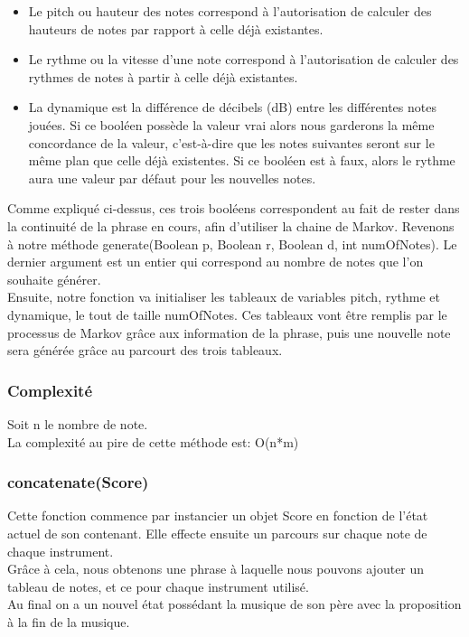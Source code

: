 \documentclass[12pt, a4paper]{article}
\begin{document}
                \begin{itemize}
                    \item Le pitch ou hauteur des notes correspond à l'autorisation de calculer des hauteurs de notes par rapport à celle déjà existantes.
                    \item Le rythme ou la vitesse d'une note correspond à l'autorisation de calculer des rythmes de notes à partir à celle déjà existantes.
                    \item La dynamique est la différence de décibels (dB) entre les différentes notes jouées. Si ce booléen possède la valeur vrai alors nous garderons la même concordance de la valeur, c’est-à-dire que les notes suivantes seront sur le même plan que celle déjà existentes. Si ce booléen est à faux, alors le rythme aura une valeur par défaut pour les nouvelles notes.
                \end{itemize}

                Comme expliqué ci-dessus, ces trois booléens correspondent au fait de rester dans la continuité de la phrase en cours, afin d’utiliser la chaine de Markov.
Revenons à notre méthode generate(Boolean p, Boolean r, Boolean d, int numOfNotes). Le dernier argument est un entier qui correspond au nombre de notes que l’on souhaite générer.\\
Ensuite, notre fonction va initialiser les tableaux de variables pitch, rythme et dynamique, le tout de taille numOfNotes. Ces tableaux vont être remplis par le processus de Markov grâce aux information de la phrase, puis une nouvelle note sera générée grâce au parcourt des trois tableaux.
            
                \subsubsection*{Complexité}
                        Soit n le nombre de note.\\
                        La complexité au pire de cette méthode est: O(n*m)


            \subsubsection{concatenate(Score)}
                Cette fonction commence par instancier un objet Score en fonction de l’état actuel de son contenant. Elle effecte ensuite un parcours sur chaque note de chaque instrument. \\
Grâce à cela, nous obtenons une phrase à laquelle nous pouvons ajouter un tableau de notes, et ce pour chaque instrument utilisé.\\
Au final on a un nouvel état possédant la musique de son père avec la proposition à la fin de la musique.\\
\end{document}
